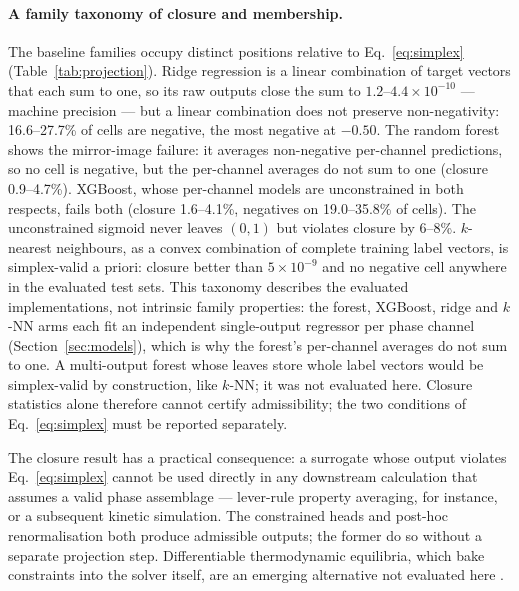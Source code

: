 \documentclass[preprint,12pt,authoryear]{elsarticle}
\begin{document}
\paragraph{A family taxonomy of closure and membership.}
The baseline families occupy distinct positions relative to
Eq.~\eqref{eq:simplex} (Table~\ref{tab:projection}). Ridge regression is
a linear combination of target vectors that each sum to one, so its raw
outputs close the sum to $1.2$--$4.4\times10^{-10}$ --- machine
precision --- but a linear combination does not preserve
non-negativity: 16.6--27.7\% of cells are negative, the most negative at
$-0.50$. The random forest shows the mirror-image failure: it averages
non-negative per-channel predictions, so no cell is negative, but the
per-channel averages do not sum to one (closure 0.9--4.7\%). XGBoost,
whose per-channel models are unconstrained in both respects, fails both
(closure 1.6--4.1\%, negatives on 19.0--35.8\% of cells). The
unconstrained sigmoid never leaves $(0,1)$ but violates closure by
6--8\%. $k$-nearest neighbours, as a convex combination of complete
training label vectors, is simplex-valid a priori: closure better than
$5\times10^{-9}$ and no negative cell anywhere in the evaluated test
sets. This taxonomy describes the evaluated implementations, not intrinsic
family properties: the forest, XGBoost, ridge and $k$-NN arms each fit an
independent single-output regressor per phase channel
(Section~\ref{sec:models}), which is why the forest's per-channel averages
do not sum to one. A multi-output forest whose leaves store whole label
vectors would be simplex-valid by construction, like $k$-NN; it was not
evaluated here. Closure statistics alone therefore cannot certify admissibility;
the two conditions of Eq.~\eqref{eq:simplex} must be reported
separately.

\begin{table}[htbp]
\centering
\caption{Output-space geometry of the evaluated families. (A) Fraction of
test cells with negative predicted fraction (mean over three seeds);
min cell gives the most negative prediction. (B) Raw row-sum closure for
the linear and local baselines. (C) Test MAE of the unconstrained sigmoid
MLP scored raw, scored after simplex projection, and the stored renorm
variant (the same projection applied at evaluation).}
\label{tab:projection}
\small

\end{table}

The closure result has a practical consequence: a surrogate whose output
violates Eq.~\eqref{eq:simplex} cannot be used directly in any downstream
calculation that assumes a valid phase assemblage --- lever-rule property
averaging, for instance, or a subsequent kinetic simulation. The constrained
heads and post-hoc renormalisation both produce admissible outputs; the
former do so without a separate projection step. Differentiable
thermodynamic equilibria, which bake constraints into the solver itself,
are an emerging alternative not evaluated here
\citep{benhicham2026diffthermo}.
\end{document}
